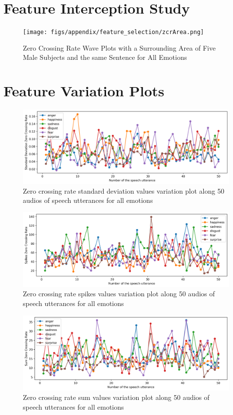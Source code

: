 \section{Feature Interception Study}


\begin{figure}[H]
	\centering
	\texttt{[image: figs/appendix/feature\_selection/zcrArea.png]}
	\caption{Zero Crossing Rate Wave Plots with a Surrounding Area of Five Male Subjects and the same Sentence for All Emotions}
	\label{fig:zcrArea}
\end{figure}

\section{Feature Variation Plots}

\begin{figure}[H]
	\centering
	\includegraphics[width=.8\linewidth]{figs/appendix/feature_selection/stdZCRVar.png}
	\caption{Zero crossing rate standard deviation values variation plot along 50 audios of speech utterances for all emotions}
	\label{fig:stdZCRVar}
\end{figure}

\begin{figure}[H]
	\centering
	\includegraphics[width=.8\linewidth]{figs/appendix/feature_selection/spikesZCRVar.png}
	\caption{Zero crossing rate spikes values variation plot along 50 audios of speech utterances for all emotions}
	\label{fig:spikesZCRVar}
\end{figure}

\begin{figure}[H]
	\centering
	\includegraphics[width=.8\linewidth]{figs/appendix/feature_selection/sumZCRVar.png}
	\caption{Zero crossing rate sum values variation plot along 50 audios of speech utterances for all emotions}
	\label{fig:sumZCRVar}
\end{figure}


